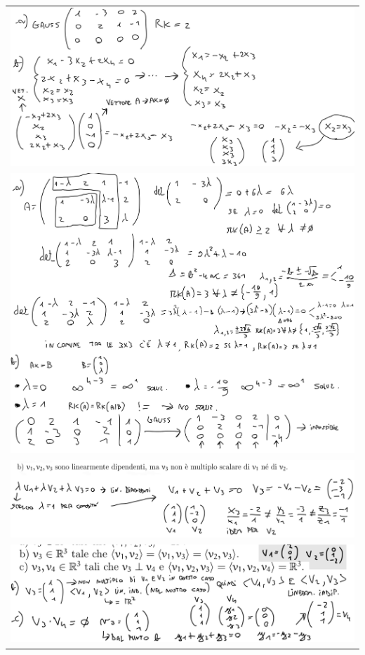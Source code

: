 \documentclass[10pt]{article}
\begin{document}
\begin{landscape}
\noindent
\begin{minipage}[t]{0.49\textwidth}
\begin{tabular}{c}
    \includegraphics[scale=0.12]{es1.jpeg} \\ 
    \includegraphics[scale=0.16]{es2.jpeg} \\
    \includegraphics[scale=0.12]{es4.jpeg} \\
    \includegraphics[scale=0.15]{es5.png} \\

\end{tabular}
\end{minipage}
\end{landscape}
\end{document}

